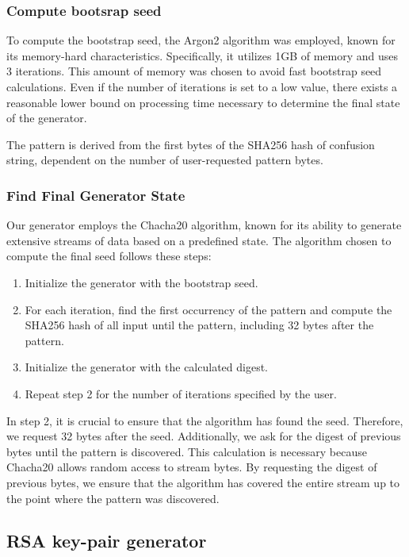 \documentclass{article} %
\begin{document}
\subsubsection{Compute bootsrap seed}

To compute the bootstrap seed, the Argon2 algorithm was employed, known for its memory-hard characteristics. Specifically, it utilizes 1GB of memory and uses 3 iterations. This amount of memory was chosen to avoid fast bootstrap seed calculations. Even if the number of iterations is set to a low value, there exists a reasonable lower bound on processing time necessary to determine the final state of the generator.

The pattern is derived from the first bytes of the SHA256 hash of confusion string, dependent on the number of user-requested pattern bytes.

\subsubsection{Find Final Generator State}

Our generator employs the Chacha20 algorithm, known for its ability to generate extensive streams of data based on a predefined state. The algorithm chosen to compute the final seed follows these steps:

\begin{enumerate}
    \item Initialize the generator with the bootstrap seed.
    \item For each iteration, find the first occurrency of the pattern and compute the SHA256 hash of all input until the pattern, including 32 bytes after the pattern.
    \item Initialize the generator with the calculated digest.
    \item Repeat step 2 for the number of iterations specified by the user.
\end{enumerate}

In step 2, it is crucial to ensure that the algorithm has found the seed. Therefore, we request 32 bytes after the seed. Additionally, we ask for the digest of previous bytes until the pattern is discovered. This calculation is necessary because Chacha20 allows random access to stream bytes. By requesting the digest of previous bytes, we ensure that the algorithm has covered the entire stream up to the point where the pattern was discovered.
\subsection{RSA key-pair generator}
\end{document}
